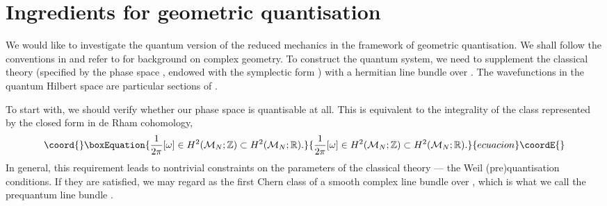\documentclass[a4paper,11pt]{article}
\begin{document}
\section{Ingredients for geometric quantisation}


We would like to investigate the quantum version of the reduced
mechanics in the framework of geometric quantisation.
We shall follow the conventions in 
\cite{Woo} and refer to \cite{GH}
for background on complex geometry. 
To construct the quantum system, we need to supplement the classical 
theory (specified by the phase space 
\coordHE{}, endowed with the symplectic form 
\myHighlight{$\omega$}\coordHE{}) with a hermitian line bundle \coordHE{} over \coordHE{}.
The wavefunctions in the quantum Hilbert space are particular 
sections of \coordHE{}.

To start with, we should verify whether our phase space is quantisable
at all. This is equivalent to the integrality of the class represented
by the closed form \coordHE{} in de Rham cohomology,
\begin{equation}\coord{}\boxEquation{ \label{Weil}
\frac{1}{2\pi}[\omega] \in H^{2}({\cal M}_{N};\mathbb{Z})\subset 
H^{2}({\cal M}_{N};\mathbb{R}).
}{ \frac{1}{2\pi}[\omega] \in H^{2}({\cal M}_{N};\mathbb{Z})\subset 
H^{2}({\cal M}_{N};\mathbb{R}).
}{ecuacion}\coordE{}\end{equation}
In general, this requirement leads to nontrivial constraints on the
parameters of the classical theory --- the Weil (pre)quantisation
conditions. If they are satisfied, we may regard
\coordHE{} as the
first Chern class of a smooth complex line bundle over \coordHE{},
which is what we call the prequantum line bundle \coordHE{}. 
\end{document}
